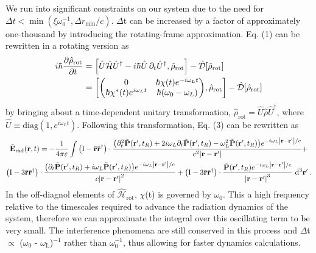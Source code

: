 We run into significant constraints on our system due to the need for $\Delta t < \min(\xi \omega_0^{-1}, \Delta r_\text{min}/c)$.  $\Delta$t can be increased by a factor of approximately one-thousand by introducing the rotating-frame approximation.  Eq. (1) can be rewritten in a rotating version as
\begin{equation}
  \begin{aligned}
    i \hbar \pdv{\hat{\rho}_\text{rot}}{t} &= \commutator{\hat{U} \hat{\mathcal{H}} \hat{U}^\dagger - i \hbar \hat{U} \, \partial_t \hat{U}^\dagger}{\hat{\rho}_\text{rot}} - \hat{\mathcal{D}}[\hat{\rho}_\text{rot}] \\
    &= \commutator{\mqty(0 & \hbar \chi(t)e^{-i \omega_L t} \\ \hbar \chi^*(t) e^{i \omega_L t} & \hbar\qty(\omega_0 - \omega_L))}{\hat{\rho}_\text{rot}} - \hat{\mathcal{D}}[\hat{\rho}_\text{rot}]
  \end{aligned}
  \label{eq:rotating liouville}
\end{equation}
by bringing about a time-dependent unitary transformation, $\hat{\rho}_\text{rot} = \hat{U}\hat{\rho}\hat{U}^\dagger$, where $\hat{U} \equiv \text{diag}(1, e^{i \omega_L t})$.  Following this transformation, Eq. (3) can be rewritten as
\begin{equation}
  \begin{gathered}
    \tilde{\vb{E}}_\text{rad}(\vb{r}, t) = -\frac{1}{4\pi \varepsilon} \int
    \qty(\mathrm{I} -  \bar{\vb{r}}\bar{\vb{r}}^\dagger) \cdot \frac{\qty(\partial_t^2 \tilde{\vb{P}}(\vb{r}', t_R) + 2 i \omega_L \partial_t \tilde{\vb{P}}(\vb{r}', t_R) - \omega_L^2 \tilde{\vb{P}}(\vb{r}', t_R)) e^{-i \omega_L \abs{\vb{r} - \vb{r}'}/c}}{c^2 \abs{\vb{r}-\vb{r}'}} + \\
    \qty(\mathrm{I} - 3\bar{\vb{r}}\bar{\vb{r}}^\dagger) \cdot \frac{\qty(\partial_t \tilde{\vb{P}}(\vb{r}', t_R) + i \omega_L \tilde{\vb{P}}(\vb{r}', t_R))e^{-i \omega_L \abs{\vb{r} - \vb{r}'}/c}}{c \abs{\vb{r}-\vb{r}'}^2} +
    \qty(\mathrm{I} - 3\bar{\vb{r}}\bar{\vb{r}}^\dagger) \cdot \frac{                \tilde{\vb{P}}(\vb{r}', t_R) e^{-i \omega_L \abs{\vb{r} - \vb{r}'}/c}}{\abs{\vb{r}-\vb{r}'}^3}
    \, \dd[3]{\vb{r'}}.
  \end{gathered}
  \label{eq:radiated envelope}
\end{equation}
In the off-diagnol elements of $\hat{\mathcal{H}}_\text{rot}$, $\chi$(t) is governed by $\omega_\text{0}$.  This a high frequency relative to the timescales required to advance the radiation dynamics of the system, therefore we can approximate the integral over this oscillating term to be very small.  The interference phenomena are still conserved in this process and $\Delta$t $\propto$ ($\omega_\text{0}$ - $\omega_\text{L}$)$^{-1}$ rather than $\omega_\text{0}^{-1}$, thus allowing for faster dynamics calculations.

